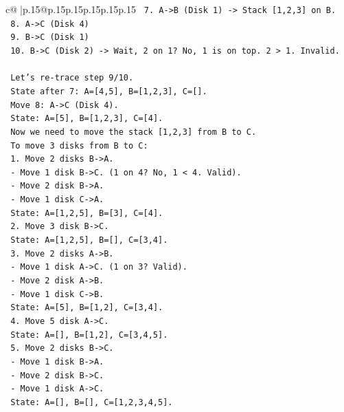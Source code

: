 \documentclass{article}
\begin{document}
{\begin{supertabular}{c@{$\;$}|p{.15\linewidth}@{}p{.15\linewidth}p{.15\linewidth}p{.15\linewidth}p{.15\linewidth}p{.15\linewidth}}
{{{\texttt{    7. A{-}>B (Disk 1) {-}> Stack {[}1,2,3{]} on B.} \\
\texttt{    8. A{-}>C (Disk 4)} \\
\texttt{    9. B{-}>C (Disk 1)} \\
\texttt{    10. B{-}>C (Disk 2) {-}> Wait, 2 on 1? No, 1 is on top. 2 > 1. Invalid.} \\
\\ 
\texttt{    Let's re{-}trace step 9/10.} \\
\texttt{    State after 7: A={[}4,5{]}, B={[}1,2,3{]}, C={[}{]}.} \\
\texttt{    Move 8: A{-}>C (Disk 4).} \\
\texttt{    State: A={[}5{]}, B={[}1,2,3{]}, C={[}4{]}.} \\
\texttt{    Now we need to move the stack {[}1,2,3{]} from B to C.} \\
\texttt{    To move 3 disks from B to C:} \\
\texttt{    1. Move 2 disks B{-}>A.} \\
\texttt{       {-} Move 1 disk B{-}>C. (1 on 4? No, 1 < 4. Valid).} \\
\texttt{       {-} Move 2 disk B{-}>A.} \\
\texttt{       {-} Move 1 disk C{-}>A.} \\
\texttt{    State: A={[}1,2,5{]}, B={[}3{]}, C={[}4{]}.} \\
\texttt{    2. Move 3 disk B{-}>C.} \\
\texttt{    State: A={[}1,2,5{]}, B={[}{]}, C={[}3,4{]}.} \\
\texttt{    3. Move 2 disks A{-}>B.} \\
\texttt{       {-} Move 1 disk A{-}>C. (1 on 3? Valid).} \\
\texttt{       {-} Move 2 disk A{-}>B.} \\
\texttt{       {-} Move 1 disk C{-}>B.} \\
\texttt{    State: A={[}5{]}, B={[}1,2{]}, C={[}3,4{]}.} \\
\texttt{    4. Move 5 disk A{-}>C.} \\
\texttt{    State: A={[}{]}, B={[}1,2{]}, C={[}3,4,5{]}.} \\
\texttt{    5. Move 2 disks B{-}>C.} \\
\texttt{       {-} Move 1 disk B{-}>A.} \\
\texttt{       {-} Move 2 disk B{-}>C.} \\
\texttt{       {-} Move 1 disk A{-}>C.} \\
\texttt{    State: A={[}{]}, B={[}{]}, C={[}1,2,3,4,5{]}.} \\
}}}
\end{supertabular}}
\end{document}
